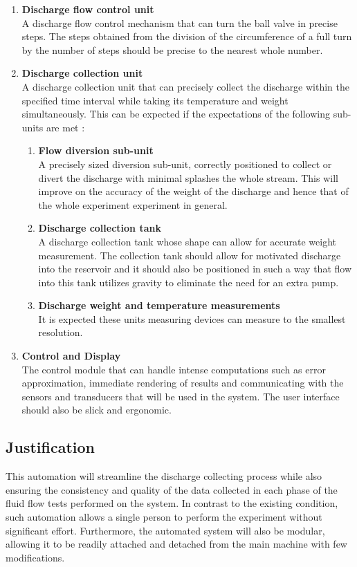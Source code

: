 \begin{enumerate}
    \item \textbf{Discharge flow control unit}\\
    A discharge flow control mechanism that can turn the ball valve in precise steps. The steps obtained from the division of the circumference of a full turn by the number of steps should be precise to the nearest whole number.
    \item \textbf{Discharge collection unit}\\
    A discharge collection unit that can precisely collect the discharge within the specified time interval while taking its temperature and weight simultaneously. This can be expected if the expectations of the following sub-units are met :
    \begin{enumerate}
        \item \textbf{Flow diversion sub-unit}\\
        A precisely sized diversion sub-unit, correctly positioned to collect or divert the discharge with minimal splashes the whole stream. This will improve on the accuracy of the weight of the discharge and hence that of the whole experiment experiment in general.
        \item \textbf{Discharge collection tank}\\
        A discharge collection tank whose shape can allow for accurate weight measurement. The collection tank should allow for motivated discharge into the reservoir and it should also be positioned in such a way that flow into this tank utilizes gravity to eliminate the need for an extra pump.
        \item \textbf{Discharge weight and temperature measurements}\\
        It is expected these units measuring devices can measure to the smallest resolution.
    \end{enumerate}
    \item \textbf{Control and Display}\\
    The control module that can handle intense computations such as error approximation, immediate rendering of results and communicating with the sensors and transducers that will be used in the system. The user interface should also be slick and ergonomic.
\end{enumerate}

\subsection{Justification}
This automation will streamline the discharge collecting process while also ensuring the consistency and quality of the data collected in each phase of the fluid flow tests performed on the system. In contrast to the existing condition, such automation allows a single person to perform the experiment without significant effort. Furthermore, the automated system will also be modular, allowing it to be readily attached and detached from the main machine with few modifications.
